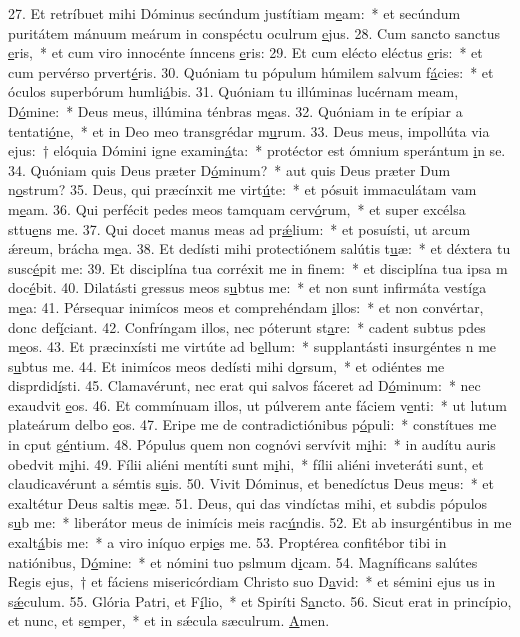 27. Et retríbuet mihi Dóminus secúndum justítiam m\uline{e}am:~* et secúndum puritátem mánuum meárum in conspéctu oculrum \uline{e}jus.
28. Cum sancto sanctus \uline{e}ris,~* et cum viro innocénte ínncens \uline{e}ris:
29. Et cum elécto eléctus \uline{e}ris:~* et cum pervérso prvert\uline{é}ris.
30. Quóniam tu pópulum húmilem salvum f\uline{á}cies:~* et óculos superbórum humli\uline{á}bis.
31. Quóniam tu illúminas lucérnam meam, D\uline{ó}mine:~* Deus meus, illúmina ténbras m\uline{e}as.
32. Quóniam in te erípiar a tentati\uline{ó}ne,~* et in Deo meo transgrédar m\uline{u}rum.
33. Deus meus, impollúta via ejus:~† elóquia Dómini igne examin\uline{á}ta:~* protéctor est ómnium sperántum \uline{i}n se.
34. Quóniam quis Deus præter D\uline{ó}minum?~* aut quis Deus præter Dum n\uline{o}strum?
35. Deus, qui præcínxit me virt\uline{ú}te:~* et pósuit immaculátam vam m\uline{e}am.
36. Qui perfécit pedes meos tamquam cerv\uline{ó}rum,~* et super excélsa sttu\uline{e}ns me.
37. Qui docet manus meas ad pr\uline{ǽ}lium:~* et posuísti, ut arcum ǽreum, brácha m\uline{e}a.
38. Et dedísti mihi protectiónem salútis t\uline{u}æ:~* et déxtera tu susc\uline{é}pit me:
39. Et disciplína tua corréxit me in f\uline{i}nem:~* et disciplína tua ipsa m doc\uline{é}bit.
40. Dilatásti gressus meos s\uline{u}btus me:~* et non sunt infirmáta vestíga m\uline{e}a:
41. Pérsequar inimícos meos et comprehéndam \uline{i}llos:~* et non convértar, donc def\uline{í}ciant.
42. Confríngam illos, nec póterunt st\uline{a}re:~* cadent subtus pdes m\uline{e}os.
43. Et præcinxísti me virtúte ad b\uline{e}llum:~* supplantásti insurgéntes n me s\uline{u}btus me.
44. Et inimícos meos dedísti mihi d\uline{o}rsum,~* et odiéntes me disprdid\uline{í}sti.
45. Clamavérunt, nec erat qui salvos fáceret ad D\uline{ó}minum:~* nec exaudvit \uline{e}os.
46. Et commínuam illos, ut púlverem ante fáciem v\uline{e}nti:~* ut lutum plateárum delbo \uline{e}os.
47. Eripe me de contradictiónibus p\uline{ó}puli:~* constítues me in cput g\uline{é}ntium.
48. Pópulus quem non cognóvi servívit m\uline{i}hi:~* in audítu auris obedvit m\uline{i}hi.
49. Fílii aliéni mentíti sunt m\uline{i}hi,~* fílii aliéni inveteráti sunt, et claudicavérunt a sémtis s\uline{u}is.
50. Vivit Dóminus, et benedíctus Deus m\uline{e}us:~* et exaltétur Deus saltis m\uline{e}æ.
51. Deus, qui das vindíctas mihi, et subdis pópulos s\uline{u}b me:~* liberátor meus de inimícis meis rac\uline{ú}ndis.
52. Et ab insurgéntibus in me exalt\uline{á}bis me:~* a viro iníquo erpi\uline{e}s me.
53. Proptérea confitébor tibi in natiónibus, D\uline{ó}mine:~* et nómini tuo pslmum d\uline{i}cam.
54. Magníficans salútes Regis ejus,~† et fáciens misericórdiam Christo suo D\uline{a}vid:~* et sémini ejus us in s\uline{ǽ}culum.
55. Glória Patri, et F\uline{í}lio,~* et Spiríti S\uline{a}ncto.
56. Sicut erat in princípio, et nunc, et s\uline{e}mper,~* et in sǽcula sæculrum. \uline{A}men.
